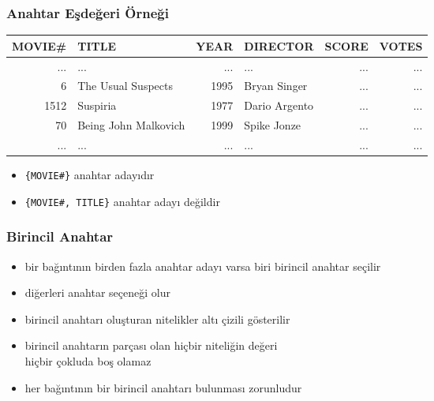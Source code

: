 \documentclass[dvipsnames]{beamer}
\theoremstyle{plain}
\begin{document}
\begin{frame}
  \frametitle{Anahtar Eşdeğeri Örneği}

 \begin{footnotesize}
    \begin{table}
      \begin{tabular}{|r|l|r|l|r|r|}\hline
MOVIE\# & TITLE                & YEAR & DIRECTOR      & SCORE & VOTES\\\hline\hline
    ... & ...                  &  ... & ...           &   ... &   ...\\\hline
      6 & The Usual Suspects   & 1995 & Bryan Singer  &   ... &   ...\\\hline
   1512 & Suspiria             & 1977 & Dario Argento &   ... &   ...\\\hline
     70 & Being John Malkovich & 1999 & Spike Jonze   &   ... &   ...\\\hline
    ... & ...                  &  ... & ...           &   ... &   ...\\\hline
      \end{tabular}
    \end{table}
    \end{footnotesize}
    
    \begin{itemize}
      \item \texttt{\{MOVIE\#\}} anahtar adayıdır
      \item \texttt{\{MOVIE\#, TITLE\}} anahtar adayı değildir
    \end{itemize}
\end{frame}

\begin{frame}
  \frametitle{Birincil Anahtar}

  \begin{itemize}
    \item bir bağıntının birden fazla anahtar adayı varsa biri \alert{birincil anahtar} seçilir
    \item diğerleri anahtar seçeneği olur
    \item birincil anahtarı oluşturan nitelikler altı çizili gösterilir

    \pause
    \medskip
    \item birincil anahtarın parçası olan hiçbir niteliğin değeri\\
      hiçbir çokluda boş olamaz
    \item her bağıntının bir birincil anahtarı bulunması zorunludur
    
  \end{itemize}
\end{frame}
\end{document}
